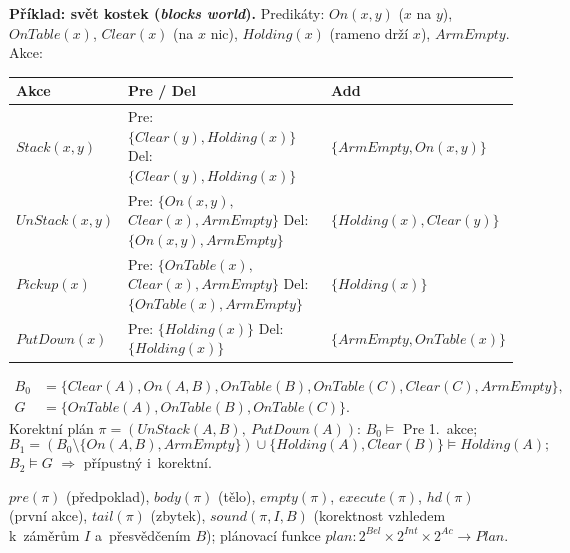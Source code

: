 \documentclass[11pt,a4paper]{article}
\theoremstyle{definition}
\begin{document}
\medskip
\noindent\textbf{Příklad: svět kostek (\emph{blocks world}).}
Predikáty: $\mathit{On}(x,y)$ ($x$ na $y$), $\mathit{OnTable}(x)$, $\mathit{Clear}(x)$
(na $x$ nic), $\mathit{Holding}(x)$ (rameno drží $x$), $\mathit{ArmEmpty}$.
Akce:
\begin{center}
\small
\begin{tabular}{p{} p{} p{}}
\toprule
\textbf{Akce} & \textbf{Pre / Del} & \textbf{Add} \\
\midrule
$\mathit{Stack}(x,y)$
  & Pre: $\{\mathit{Clear}(y), \mathit{Holding}(x)\}$ \newline
    Del: $\{\mathit{Clear}(y), \mathit{Holding}(x)\}$
  & $\{\mathit{ArmEmpty}, \mathit{On}(x,y)\}$ \\
$\mathit{UnStack}(x,y)$
  & Pre: $\{\mathit{On}(x,y),$ $\mathit{Clear}(x),\mathit{ArmEmpty}\}$ \newline
    Del: $\{\mathit{On}(x,y),\mathit{ArmEmpty}\}$
  & $\{\mathit{Holding}(x), \mathit{Clear}(y)\}$ \\
$\mathit{Pickup}(x)$
  & Pre: $\{\mathit{OnTable}(x),$ $\mathit{Clear}(x),\mathit{ArmEmpty}\}$ \newline
    Del: $\{\mathit{OnTable}(x),\mathit{ArmEmpty}\}$
  & $\{\mathit{Holding}(x)\}$ \\
$\mathit{PutDown}(x)$
  & Pre: $\{\mathit{Holding}(x)\}$ \newline
    Del: $\{\mathit{Holding}(x)\}$
  & $\{\mathit{ArmEmpty}, \mathit{OnTable}(x)\}$ \\
\bottomrule
\end{tabular}
\end{center}
\begin{align*}
B_0 &= \{\mathit{Clear}(A), \mathit{On}(A,B), \mathit{OnTable}(B),
\mathit{OnTable}(C), \mathit{Clear}(C), \mathit{ArmEmpty}\},\\
G &= \{\mathit{OnTable}(A), \mathit{OnTable}(B), \mathit{OnTable}(C)\}.
\end{align*}
Korektní plán $\pi = (\mathit{UnStack}(A,B),\ \mathit{PutDown}(A))$: $B_0 \models$ Pre
1.~akce;
\[ B_1 = (B_0 \setminus \{\mathit{On}(A,B),\mathit{ArmEmpty}\}) \cup
\{\mathit{Holding}(A),\mathit{Clear}(B)\} \models \mathit{Holding}(A); \]
$B_2 \models G$ $\Rightarrow$ přípustný i~korektní.

\begin{defbox}
$\mathit{pre}(\pi)$ (předpoklad), $\mathit{body}(\pi)$ (tělo), $\mathit{empty}(\pi)$,
$\mathit{execute}(\pi)$, $\mathit{hd}(\pi)$ (první akce), $\mathit{tail}(\pi)$ (zbytek),
$\mathit{sound}(\pi,I,B)$ (korektnost vzhledem k~záměrům $I$ a~přesvědčením $B$);
plánovací funkce
$\mathit{plan} : 2^{\mathit{Bel}} \times 2^{\mathit{Int}} \times 2^{\mathit{Ac}} \to \mathit{Plan}$.
\end{defbox}
\end{document}
